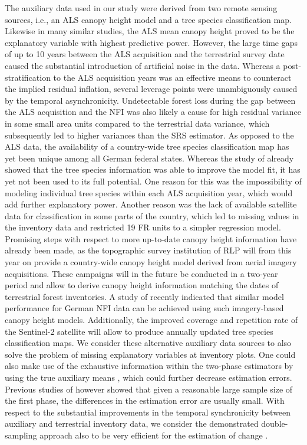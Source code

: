 The auxiliary data used in our study were derived from two remote sensing sources, i.e., an ALS canopy height model and a tree species classification map. Likewise in many similar studies, the ALS mean canopy height proved to be the explanatory variable with highest predictive power. However, the large time gaps of up to 10 years between the ALS acquisition and the terrestrial survey date caused the substantial introduction of artificial noise in the data. Whereas a post-stratification to the ALS acquisition years was an effective means to counteract the implied residual inflation, several leverage points were unambiguously caused by the temporal asynchronicity. Undetectable forest loss during the gap between the ALS acquisition and the NFI was also likely a cause for high residual variance in some small area units compared to the terrestrial data variance, which subsequently led to higher variances than the SRS estimator. As opposed to the ALS data, the availability of a country-wide tree species classification map has yet been unique among all German federal states. Whereas the study of \citet{hill2017a} already showed that the tree species information was able to improve the model fit, it has yet not been used to its full potential. One reason for this was the impossibility of modeling individual tree species within each ALS acquisition year, which would add further explanatory power. Another reason was the lack of available satellite data for classification in some parts of the country, which led to missing values in the inventory data and restricted 19 FR units to a simpler regression model. Promising steps with respect to more up-to-date canopy height information have already been made, as the topographic survey institution of RLP will from this year on provide a country-wide canopy height model derived from aerial imagery acquisitions. These campaigns will in the future be conducted in a two-year period and allow to derive canopy height information matching the dates of terrestrial forest inventories. A study of \citet{kirchhoefer2017} recently indicated that similar model performance for German NFI data can be achieved using such imagery-based canopy height models. Additionally, the improved coverage and repetition rate of the Sentinel-2 satellite \citep{sentinel2} will allow to produce annually updated tree species classification maps. We consider these alternative auxiliary data sources to also solve the problem of missing explanatory variables at inventory plots. One could also make use of the exhaustive information within the two-phase estimators by using the true auxiliary means \citep{mandallaz2013a, mandallaz2013b}, which could further decrease estimation errors. Previous studies of \citet{mandallaz2013b} however showed that given a reasonable large sample size of the first phase, the differences in the estimation error are usually small. With respect to the substantial improvements in the temporal synchronicity between auxiliary and terrestrial inventory data, we consider the demonstrated double-sampling approach also to be very efficient for the estimation of change \citep{massey2015b}.\par


